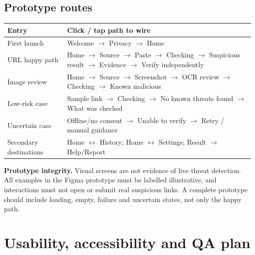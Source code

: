 \documentclass[10pt,a4paper]{article}
\begin{document}
\subsection{Prototype routes}
\begin{tabularx}{\linewidth}{@{}p{40mm}Y@{}}\toprule
\textbf{Entry} & \textbf{Click / tap path to wire} \\ \midrule
First launch & Welcome $\rightarrow$ Privacy $\rightarrow$ Home \\
URL happy path & Home $\rightarrow$ Source $\rightarrow$ Paste $\rightarrow$ Checking $\rightarrow$ Suspicious result $\rightarrow$ Evidence $\rightarrow$ Verify independently \\
Image review & Home $\rightarrow$ Source $\rightarrow$ Screenshot $\rightarrow$ OCR review $\rightarrow$ Checking $\rightarrow$ Known malicious \\
Low-risk case & Sample link $\rightarrow$ Checking $\rightarrow$ No known threats found $\rightarrow$ What was checked \\
Uncertain case & Offline/no consent $\rightarrow$ Unable to verify $\rightarrow$ Retry / manual guidance \\
Secondary destinations & Home $\leftrightarrow$ History; Home $\leftrightarrow$ Settings; Result $\rightarrow$ Help/Report \\
\bottomrule\end{tabularx}
\begin{riskbox}
\textbf{Prototype integrity.} Visual screens are not evidence of live threat detection. All examples in the Figma prototype must be labelled illustrative, and interactions must not open or submit real suspicious links. A complete prototype should include loading, empty, failure and uncertain states, not only the happy path.
\end{riskbox}

\section{Usability, accessibility and QA plan}
\end{document}
